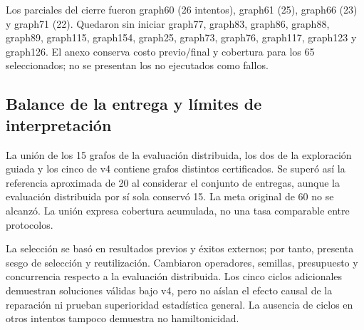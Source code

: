 Los parciales del cierre fueron graph60 (26 intentos), graph61 (25), graph66 (23) y graph71 (22). Quedaron sin iniciar graph77, graph83, graph86, graph88, graph89, graph115, graph154, graph25, graph73, graph76, graph117, graph123 y graph126. El anexo conserva costo previo/final y cobertura para los 65 seleccionados; no se presentan los no ejecutados como fallos.

\subsection{Balance de la entrega y límites de interpretación}
\begin{table}[H]\centering\small
\caption{Resultados por protocolo. Las filas conservan sus propios presupuestos y denominadores; no se calcula una tasa de éxito conjunta.}\label{tab:stagesclosed}

\end{table}

\begin{table}[H]\centering\small
\caption{Siete grafos adicionales certificados en las exploraciones, ausentes del conjunto de 15 resueltos de la evaluación distribuida. Los conteos son intentos exitosos.}\label{tab:exploratorysolved}

\end{table}

La unión de los 15 grafos de la evaluación distribuida, los dos de la exploración guiada y los cinco de v4 contiene \UnionCertifiedGraphs{} grafos distintos certificados. Se superó así la referencia aproximada de 20 al considerar el conjunto de entregas, aunque la evaluación distribuida por sí sola conservó 15. La meta original de 60 no se alcanzó. La unión expresa cobertura acumulada, no una tasa comparable entre protocolos.

La selección se basó en resultados previos y éxitos externos; por tanto, presenta sesgo de selección y reutilización. Cambiaron operadores, semillas, presupuesto y concurrencia respecto a la evaluación distribuida. Los cinco ciclos adicionales demuestran soluciones válidas bajo v4, pero no aíslan el efecto causal de la reparación ni prueban superioridad estadística general. La ausencia de ciclos en otros intentos tampoco demuestra no hamiltonicidad.
